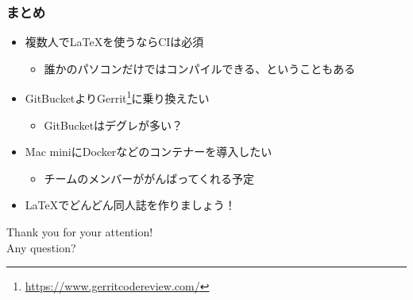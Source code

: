 \begin{frame}
  \frametitle{まとめ}

  \begin{itemize}
    \item<2-> 複数人で\LaTeX を使うならCIは必須
    \begin{itemize}
      \item 誰かのパソコンだけではコンパイルできる、ということもある
    \end{itemize}

    \item<3-> GitBucketよりGerrit\footnote[frame]{\url{https://www.gerritcodereview.com/}}に乗り換えたい
    \begin{itemize}
      \item GitBucketはデグレが多い？
    \end{itemize}

    \item<4-> Mac miniにDockerなどのコンテナーを導入したい
    \begin{itemize}
      \item チームのメンバーががんばってくれる予定
    \end{itemize}

    \item<5-> \LaTeX でどんどん同人誌を作りましょう！
  \end{itemize}
\end{frame}

\begin{frame}
  \centering
  {\Huge Thank you for your attention!\\
    \vspace{1em}
    Any question?
  }
\end{frame}


